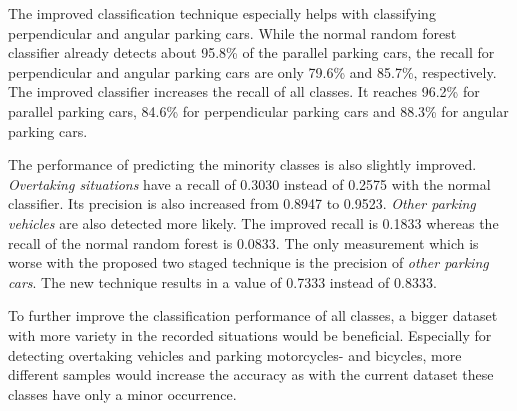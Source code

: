 \begin{table}


\caption{Confusion Matrix of the best found configuration of the proposed two staged classification technique (two random forests and using 10 surrounding samples).}
\label{table:surrounding_classifier_confusion_matrix}
\end{table}


The improved classification technique especially helps with classifying perpendicular and angular parking cars. While the normal random forest classifier already detects about 95.8\% of the parallel parking cars, the recall for perpendicular and angular parking cars are only 79.6\% and 85.7\%, respectively. The improved classifier increases the recall of all classes. It reaches 96.2\% for parallel parking cars, 84.6\% for perpendicular parking cars and 88.3\% for angular parking cars. 

The performance of predicting the minority classes is also slightly improved. \emph{Overtaking situations} have a recall of 0.3030 instead of 0.2575 with the normal classifier. Its precision is also increased from 0.8947 to 0.9523. \emph{Other parking vehicles} are also detected more likely. The improved recall is 0.1833 whereas the recall of the normal random forest is 0.0833. The only measurement which is worse with the proposed two staged technique is the precision of \emph{other parking cars}. The new technique results in a value of 0.7333 instead of 0.8333.

To further improve the classification performance of all classes, a bigger dataset with more variety in the recorded situations would be beneficial. Especially for detecting overtaking vehicles and parking motorcycles- and bicycles, more different samples would increase the accuracy as with the current dataset these classes have only a minor occurrence. 

